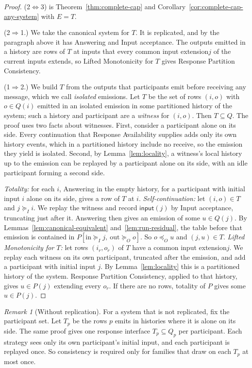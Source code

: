 \documentclass[sigconf]{cidr-2027}
\theoremstyle{remark}
\newtheorem{remark}{Remark}
\newcommand{\OutputOrd}{\preceq_O}
\newcommand{\InputGe}{\succeq_I}
\newcommand{\OutputGe}{\succeq_O}
\newcommand{\inrel}{extends\xspace}          %
\newcommand{\indesc}{input extension\xspace} %
\newcommand{\outrelpart}{extending\xspace}    %
\newcommand{\fiber}[1]{P(#1)}
\begin{document}
\begin{proof}
(2$\Leftrightarrow$3) is Theorem~\ref{thm:complete-cap} and
Corollary~\ref{cor:complete-cap-any-system} with $E=T$.

(2$\Rightarrow$1.)  We take the canonical system for $T$. It is replicated, and by the
paragraph above it has Answering and Input acceptance. The outputs emitted in
a history are rows of $T$ at inputs that every common \indesc $j$ of the
current inputs \inrel, so Lifted Monotonicity for $T$ gives Response Partition
Consistency.

(1$\Rightarrow$2.)  We build $T$ from the outputs that participants emit
before receiving any message, which we call \emph{isolated} emissions. Let
$T$ be the set of rows $(i,o)$ with $o\in Q(i)$ emitted in an isolated
emission in some partitioned history of the system; such a history and
participant are a \emph{witness} for $(i,o)$. Then $T\subseteq Q$. The
proof uses two facts about witnesses. First, consider a participant alone on
its side. Every continuation that Response Availability supplies adds only
its own history events, which in a partitioned history include no receive, so
the emission they yield is isolated. Second, by Lemma~\ref{lem:locality}, a
witness's local history up to the emission can be replayed by a participant
alone on its side, with an idle participant forming a second side.

\emph{Totality:} for each $i$, Answering in the empty history, for a
participant with initial input $i$ alone on its side, gives a row of $T$ at
$i$. \emph{Self-continuation:} let $(i,o)\in T$ and $j\InputGe i$. We replay
the witness and record $\mathsf{input}(j)$ by Input acceptance, truncating
just after it. Answering then gives an emission of some $u\in Q(j)$. By
Lemmas~\ref{lem:canonical-equivalent} and~\ref{lem:run-residual}, the table
before that emission is contained in $P[\mathrm{in}\InputGe j,\
\mathrm{out}\OutputGe o]$. So $o\OutputOrd u$ and $(j,u)\in T$. \emph{Lifted Monotonicity for $T$:} let rows $(i_r,o_r)$ of $T$ have a common
\indesc $j$. We replay each witness on its own participant, truncated after
the emission, and add a participant with initial input $j$. By
Lemma~\ref{lem:locality} this is a partitioned history of the system. Response Partition Consistency, applied to that history, gives
$u\in\fiber{j}$ \outrelpart every $o_r$. If there are no rows, totality of
$P$ gives some $u\in\fiber{j}$.
\end{proof}

\begin{remark}[Without replication]
For a system that is not replicated, fix the participant set. Let $T_p$ be
the rows $p$ emits in histories where it is alone on its side. The same proof
gives one response interface $T_p\subseteq Q_p$ per participant. Each
strategy sees only its own participant's initial input, and each participant
is replayed once. So consistency is required only for families that draw on
each $T_p$ at most once.
\end{remark}
\end{document}
